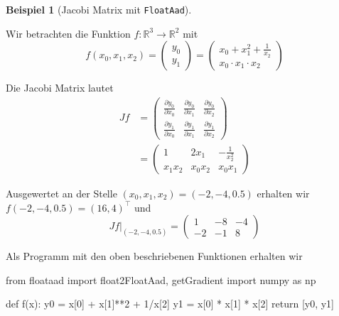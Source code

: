 \documentclass[
  a4paper,
  DIV=11]{scrreprt}
\newenvironment{Shaded}{\begin{snugshade}}{\end{snugshade}}
\newcommand{\ControlFlowTok}[1]{\textcolor[rgb]{0.00,0.23,0.31}{#1}}
\newcommand{\DecValTok}[1]{\textcolor[rgb]{0.68,0.00,0.00}{#1}}
\newcommand{\ImportTok}[1]{\textcolor[rgb]{0.00,0.46,0.62}{#1}}
\newcommand{\KeywordTok}[1]{\textcolor[rgb]{0.00,0.23,0.31}{#1}}
\newcommand{\NormalTok}[1]{\textcolor[rgb]{0.00,0.23,0.31}{#1}}
\newcommand{\OperatorTok}[1]{\textcolor[rgb]{0.37,0.37,0.37}{#1}}
\theoremstyle{definition}
\theoremstyle{definition}
\newtheorem{example}{Beispiel}[chapter]
\theoremstyle{remark}
\begin{document}
\begin{example}[Jacobi Matrix mit
\texttt{FloatAad}]\protect\hypertarget{exm-JacobianWithAad}{}\label{exm-JacobianWithAad}

Wir betrachten die Funktion
\(f : \mathbb{R}^3 \rightarrow \mathbb{R}^2\) mit \[
f(x_0, x_1, x_2) = 
    \begin{pmatrix}
        y_0 \\ y_1
    \end{pmatrix}
    =
    \begin{pmatrix}
        x_0 + x_1^2 + \frac{1}{x_2} \\
        x_0 \cdot x_1 \cdot x_2
    \end{pmatrix}
\]

Die Jacobi Matrix lautet \begin{align*}
Jf &= 
    \begin{pmatrix}
        \frac{\partial y_0}{\partial x_0} & \frac{\partial y_0}{\partial x_1} & \frac{\partial y_0}{\partial x_2} \\
        \frac{\partial y_1}{\partial x_0} & \frac{\partial y_1}{\partial x_1} & \frac{\partial y_1}{\partial x_2}
    \end{pmatrix} \\
    &=
    \begin{pmatrix}
        1 & 2x_1 & -\frac{1}{x_2 ^2} \\
        x_1 x_2 & x_0 x_2 & x_0 x_1
    \end{pmatrix}
\end{align*}

Ausgewertet an der Stelle \((x_0, x_1, x_2) = (-2, -4, 0.5)\) erhalten
wir \(f(-2, -4, 0.5) = (16, 4)^\intercal\) und \[
Jf|_{(-2,-4,0.5)} = 
\begin{pmatrix}
    1 & -8 & -4 \\
    -2 & -1 & 8
\end{pmatrix}
\]

Als Programm mit den oben beschriebenen Funktionen erhalten wir

\begin{Shaded}
\begin{Highlighting}[]
\ImportTok{from}\NormalTok{ floataad }\ImportTok{import}\NormalTok{ float2FloatAad, getGradient}
\ImportTok{import}\NormalTok{ numpy }\ImportTok{as}\NormalTok{ np}

\KeywordTok{def}\NormalTok{ f(x):}
\NormalTok{    y0 }\OperatorTok{=}\NormalTok{ x[}\DecValTok{0}\NormalTok{] }\OperatorTok{+}\NormalTok{ x[}\DecValTok{1}\NormalTok{]}\OperatorTok{**}\DecValTok{2} \OperatorTok{+} \DecValTok{1}\OperatorTok{/}\NormalTok{x[}\DecValTok{2}\NormalTok{]}
\NormalTok{    y1 }\OperatorTok{=}\NormalTok{ x[}\DecValTok{0}\NormalTok{] }\OperatorTok{*}\NormalTok{ x[}\DecValTok{1}\NormalTok{] }\OperatorTok{*}\NormalTok{ x[}\DecValTok{2}\NormalTok{]}
    \ControlFlowTok{return}\NormalTok{ [y0, y1]}


\end{Highlighting}
\end{Shaded}
\end{example}
\end{document}
